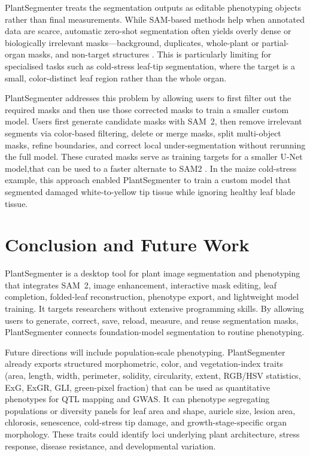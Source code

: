 \documentclass[12pt, a4paper]{article}
\begin{document}
PlantSegmenter treats the segmentation outputs as editable phenotyping objects rather than final measurements. While SAM-based methods help when annotated data are scarce, automatic zero-shot segmentation often yields overly dense or biologically irrelevant masks—background, duplicates, whole-plant or partial-organ masks, and non-target structures \citep{zhang2024adapting,williams2024leafonlysam}. This is particularly limiting for specialised tasks such as cold-stress leaf-tip segmentation, where the target is a small, color-distinct leaf region rather than the whole organ. 

PlantSegmenter addresses this problem by allowing users to first filter out the required masks and then use those corrected masks to train a smaller custom model. Users first generate candidate masks with SAM~2, then remove irrelevant segments via color-based filtering, delete or merge masks, split multi-object masks, refine boundaries, and correct local under-segmentation without rerunning the full model. These curated masks serve as training targets for a smaller U-Net model,that can be used to a faster alternate to SAM2 \citep{hinton2015distilling,zhang2023mobilesam}. In the maize cold-stress example, this approach enabled PlantSegmenter to train a custom model that segmented damaged white-to-yellow tip tissue while ignoring healthy leaf blade tissue. 

\section{Conclusion and Future Work}
\label{sec:conclusion}

PlantSegmenter is a desktop tool for plant image segmentation and phenotyping that integrates SAM~2, image enhancement, interactive mask editing, leaf completion, folded-leaf reconstruction, phenotype export, and lightweight model training. It targets researchers without extensive programming skills. By allowing users to generate, correct, save, reload, measure, and reuse segmentation masks, PlantSegmenter connects foundation-model segmentation to routine phenotyping.

Future directions will include population-scale phenotyping. PlantSegmenter already exports structured morphometric, color, and vegetation-index traits (area, length, width, perimeter, solidity, circularity, extent, RGB/HSV statistics, ExG, ExGR, GLI, green-pixel fraction) that can be used as quantitative phenotypes for QTL mapping and GWAS. It can phenotype segregating populations or diversity panels for leaf area and shape, auricle size, lesion area, chlorosis, senescence, cold-stress tip damage, and growth-stage-specific organ morphology. These traits could identify loci underlying plant architecture, stress response, disease resistance, and developmental variation.
\end{document}
